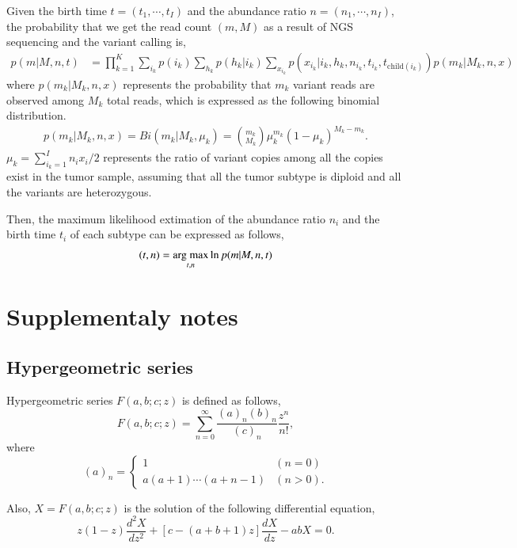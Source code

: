 \documentclass[12pt]{article}
\newcommand{\bibun}[2]{\frac{d {#1}}{d {#2}}}
\newcommand{\argmax}{\mathop{\rm arg~max}\limits}
\begin{document}
Given the birth time $t = (t_1, \cdots, t_I)$ and the abundance ratio $n = (n_1, \cdots, n_I)$, the probability that we get the read count $(m,M)$ as a result of NGS sequencing and the variant calling is,
\begin{align}
 p(m|M, n, t) & = \prod_{k=1}^{K} \sum_{i_k} p(i_k) \sum_{h_k} p(h_k | i_k) \sum_{x_{i_k}} p(x_{i_k} | i_k, h_k, n_{i_k}, t_{i_k}, t_{\mathrm{child}(i_k)}) p (m_k | M_k, n, x)
\end{align}
where $p (m_k | M_k, n, x)$ represents the probability that $m_k$ variant reads are observed among $M_k$ total reads, which is expressed as the following binomial distribution.
\begin{align}
 p (m_k | M_k, n, x) = Bi(m_k | M_k, \mu_k) = { m_k \choose M_k } \mu_k^{m_k} \left( 1 - \mu_k \right)^{M_k - m_k}.
\end{align}
$\mu_k = \sum_{i_k = 1}^{I} n_i x_i / 2$ represents the ratio of variant copies among all the copies exist in the tumor sample, assuming that all the tumor subtype is diploid and all the variants are heterozygous.

Then, the maximum likelihood extimation of the abundance ratio $n_i$ and the birth time $t_i$ of each subtype can be expressed as follows,
\begin{align}
 (t, n) = \argmax_{t, n} \ln p(m | M, n, t) \nonumber
\end{align}

\section{Supplementaly notes}
\subsection{Hypergeometric series}
Hypergeometric series $F(a,b;c;z)$ is defined as follows,
\begin{equation}
 F(a,b;c;z) = \sum_{n=0}^{\infty} \frac{(a)_n (b)_n}{(c)_n}\frac{z^n}{n!},
\end{equation}
where
\begin{equation}
 (a)_n = \begin{cases}
          1 & (n=0)\\
          a (a+1) \cdots (a+n-1)& (n>0).
         \end{cases}
\end{equation}

Also, $X = F(a,b;c;z)$ is the solution of the following differential equation,
\begin{equation}
 z(1-z)\frac{d^2 X}{d z^2} + \left[ c - (a+b+1)z \right] \bibun{X}{z} - ab X = 0.\label{hypgeo_concrete}
\end{equation}
\end{document}

